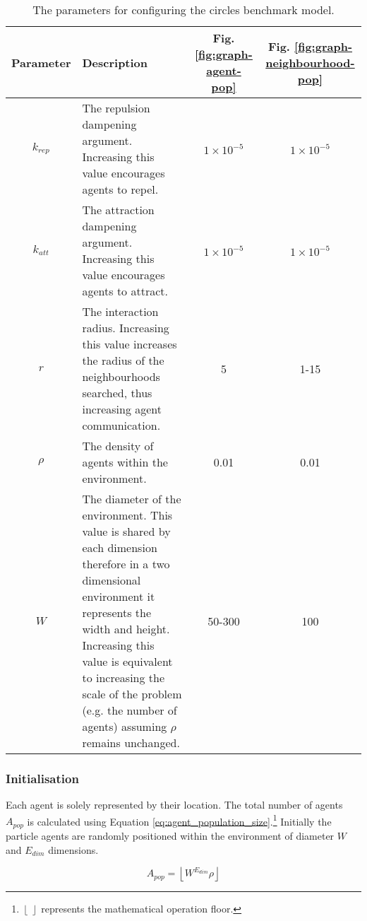     \begin{table}
      \begin{tabu}{ |c|>{\raggedright}X|c|c| }
        \hline
        \textbf{Parameter} & \textbf{Description} & Fig. \ref{fig:graph-agent-pop} & Fig. \ref{fig:graph-neighbourhood-pop} \\ \hline
        $k_{rep}$ & The repulsion dampening argument. Increasing this value encourages agents to repel. & $1\times10^{-5}$ & $1\times10^{-5}$ \\ \hline
        $k_{att}$ & The attraction dampening argument. Increasing this value encourages agents to attract. & $1\times10^{-5}$ & $1\times10^{-5}$ \\ \hline
        $r$ & The interaction radius. Increasing this value increases the radius of the neighbourhoods searched, thus increasing agent communication. & 5 & 1-15 \\ \hline
        $ \rho $ & The density of agents within the environment. & 0.01 & 0.01 \\ \hline
        $W$ & The diameter of the environment. This value is shared by each dimension therefore in a two dimensional environment it represents the width and height. Increasing this value is equivalent to increasing the scale of the problem (e.g. the number of agents) assuming $ \rho $ remains unchanged. & 50-300 & 100\\ \hline
      \end{tabu}
      \caption{\label{tab:benchmark-parameters}The parameters for configuring the circles benchmark model.}
    \vspace{-1cm}
    \end{table}    
      
    \subsubsection{Initialisation}
      Each agent is solely represented by their location. The total number of agents $A_{pop}$ is calculated using Equation \ref{eq:agent_population_size}.\footnote{$\left\lfloor\:\right\rfloor$ represents the mathematical operation floor.} Initially the particle agents are randomly positioned within the environment of diameter $W$ and $E_{dim}$ dimensions.      
      
      \begin{equation}\label{eq:agent_population_size}
        A_{pop} = \left\lfloor{W^{E_{dim}} \rho}\right\rfloor
      \end{equation}
      
